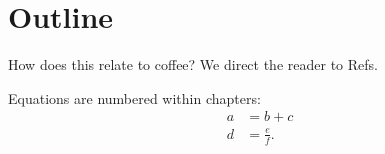 \section{Outline}

How does this relate to coffee? We direct the reader to Refs.

Equations are numbered within chapters:
\begin{align}
    a
    &= b + c \\
    d
    &= \frac{e}{f}.
\end{align}

% 
% 
% 
% 
